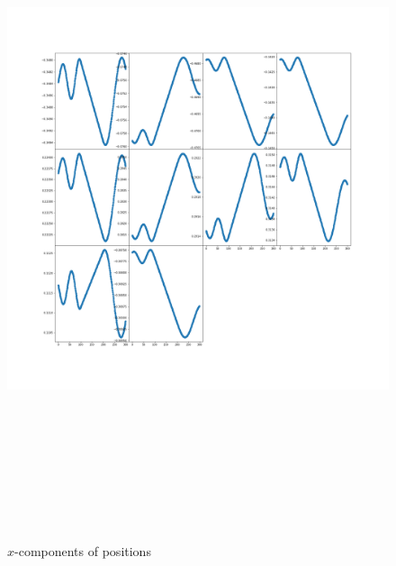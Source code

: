 \documentclass[12pt]{article}
\begin{document}
	\begin{figure}[H]
		\includegraphics[width=\linewidth, height=20cm]{subpsx3.png} \caption{$x$-components of positions} \label{subpsx3}
	\end{figure}
\end{document}
